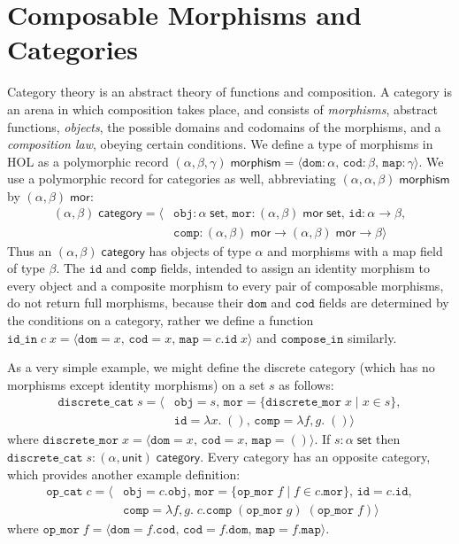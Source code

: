 \documentclass[twoside,titlepage,11pt]{article}
\begin{document}
\section{Composable Morphisms and Categories}%
Category theory is an abstract theory of functions and composition.
A category is an arena in which composition takes place, and consists of \emph{morphisms}, abstract functions, \emph{objects}, the possible domains and codomains of the morphisms, and a \emph{composition law}, obeying certain conditions.
We define a type of morphisms in HOL as a polymorphic record $(\alpha,\beta,\gamma)\;\mathsf{morphism}=\langle\mathtt{dom}:\alpha,\,\mathtt{cod}:\beta,\,\mathtt{map}:\gamma\rangle$.
We use a polymorphic record for categories as well, abbreviating $(\alpha,\alpha,\beta)\;\mathsf{morphism}$ by $(\alpha,\beta)\;\mathsf{mor}$:
\begin{align*}
(\alpha,\beta)\;\mathsf{category}=\langle&\mathtt{obj}:\alpha\;\mathsf{set},\,\mathtt{mor}:(\alpha,\beta)\;\mathsf{mor}\;\mathsf{set},\,\mathtt{id}:\alpha\to\beta,\\&\mathtt{comp}:(\alpha,\beta)\;\mathsf{mor}\to(\alpha,\beta)\;\mathsf{mor}\to\beta\rangle
\end{align*}
Thus an $(\alpha,\beta)\;\mathsf{category}$ has objects of type $\alpha$ and morphisms with a map field of type $\beta$.
The $\mathtt{id}$ and $\mathtt{comp}$ fields, intended to assign an identity morphism to every object and a composite morphism to every pair of composable morphisms, do not return full morphisms, because their $\mathtt{dom}$ and $\mathtt{cod}$ fields are determined by the conditions on a category, rather we define a function $\mathtt{id\_in}\;c\;x=\langle\mathtt{dom}=x,\,\mathtt{cod}=x,\,\mathtt{map}=c.\mathtt{id}\;x\rangle$ and $\mathtt{compose\_in}$ similarly.

As a very simple example, we might define the discrete category (which has no morphisms except identity morphisms) on a set $s$ as follows:
\begin{align*}
\mathtt{discrete\_cat}\;s=\langle&\mathtt{obj}=s,\,\mathtt{mor}=\{\mathtt{discrete\_mor}\;x\mid x\in s\},\\&\mathtt{id}=\lambda{x}.\;(),\,\mathtt{comp}=\lambda{f,g}.\;()\rangle
\end{align*}
where $\mathtt{discrete\_mor}\;x=\langle\mathtt{dom}=x,\,\mathtt{cod}=x,\,\mathtt{map}=()\rangle$.
If $s:\alpha\;\mathsf{set}$ then $\mathtt{discrete\_cat}\;s:(\alpha,\mathsf{unit})\;\mathsf{category}$.
Every category has an opposite category, which provides another example definition:
\begin{align*}
\mathtt{op\_cat}\;c=\langle&\mathtt{obj}=c.\mathtt{obj},\,\mathtt{mor}=\{\mathtt{op\_mor}\;f\mid f\in c.\mathtt{mor}\},\,\mathtt{id}=c.\mathtt{id},\\&\mathtt{comp}=\lambda{f,g}.\;c.\mathtt{comp}\;(\mathtt{op\_mor}\;g)\;(\mathtt{op\_mor}\;f)\rangle
\end{align*}
where $\mathtt{op\_mor}\;f=\langle\mathtt{dom}=f.\mathtt{cod},\,\mathtt{cod}=f.\mathtt{dom},\,\mathtt{map}=f.\mathtt{map}\rangle$.
\end{document}
